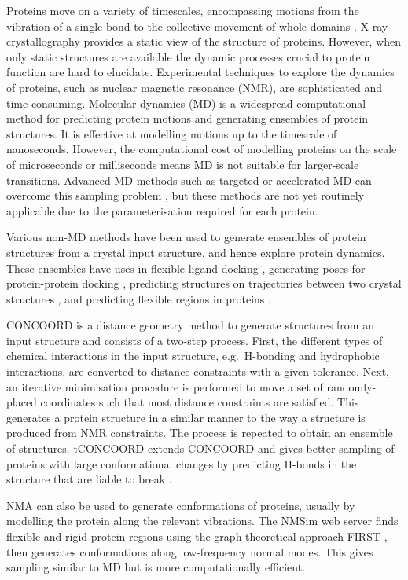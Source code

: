 Proteins move on a variety of timescales, encompassing motions from the vibration of a single bond to the collective movement of whole domains \cite{Henzler-Wildman2007, Wei2016}.
X-ray crystallography provides a static view of the structure of proteins.
However, when only static structures are available the dynamic processes crucial to protein function \cite{Henzler-Wildman2007a} are hard to elucidate.
Experimental techniques to explore the dynamics of proteins, such as nuclear magnetic resonance (NMR), are sophisticated and time-consuming.
Molecular dynamics (MD) is a widespread computational method for predicting protein motions and generating ensembles of protein structures.
It is effective at modelling motions up to the timescale of nanoseconds.
However, the computational cost of modelling proteins on the scale of microseconds or milliseconds means MD is not suitable for larger-scale transitions.
Advanced MD methods such as targeted or accelerated MD can overcome this sampling problem \cite{Maximova2016}, but these methods are not yet routinely applicable due to the parameterisation required for each protein.

Various non-MD methods have been used to generate ensembles of protein structures from a crystal input structure, and hence explore protein dynamics.
These ensembles have uses in flexible ligand docking \cite{Totrov2008}, generating poses for protein-protein docking \cite{Mustard2005}, predicting structures on trajectories between two crystal structures \cite{Weiss2009}, and predicting flexible regions in proteins \cite{Ahmed2011}.

CONCOORD \cite{DeGroot1997, DeGroot1999} is a distance geometry method to generate structures from an input structure and consists of a two-step process.
First, the different types of chemical interactions in the input structure, e.g.\ H-bonding and hydrophobic interactions, are converted to distance constraints with a given tolerance.
Next, an iterative minimisation procedure is performed to move a set of randomly-placed coordinates such that most distance constraints are satisfied.
This generates a protein structure in a similar manner to the way a structure is produced from NMR constraints.
The process is repeated to obtain an ensemble of structures.
tCONCOORD extends CONCOORD and gives better sampling of proteins with large conformational changes by predicting H-bonds in the structure that are liable to break \cite{Seeliger2007}.

NMA can also be used to generate conformations of proteins, usually by modelling the protein along the relevant vibrations.
The NMSim web server \cite{Kruger2012, Ahmed2011} finds flexible and rigid protein regions using the graph theoretical approach FIRST \cite{Jacobs2001}, then generates conformations along low-frequency normal modes.
This gives sampling similar to MD but is more computationally efficient.


